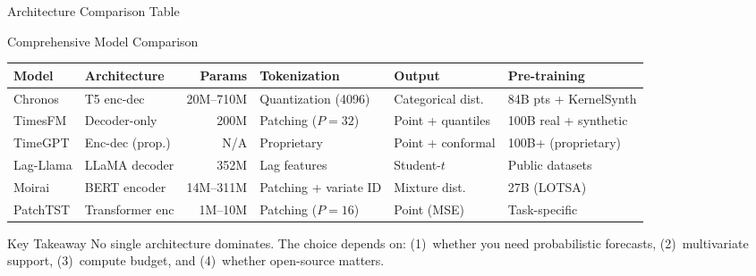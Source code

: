 \documentclass[9pt, aspectratio=169, t]{beamer}
\begin{document}
\begin{frame}{Architecture Comparison Table}
    \begin{cminipage}{0.95\textwidth}
    \vspace{-3mm}
    {\scriptsize
    \begin{block}{Comprehensive Model Comparison}
    \vspace{-2mm}
    \begin{center}
    \begin{tabular}{l|l|r|l|l|l}
        \toprule
        \textbf{Model} & \textbf{Architecture} & \textbf{Params} & \textbf{Tokenization} & \textbf{Output} & \textbf{Pre-training} \\
        \midrule
        Chronos & T5 enc-dec & 20M--710M & Quantization (4096) & Categorical dist.\ & 84B pts + KernelSynth \\
        TimesFM & Decoder-only & 200M & Patching ($P\!=\!32$) & Point + quantiles & 100B real + synthetic \\
        TimeGPT & Enc-dec (prop.) & N/A & Proprietary & Point + conformal & 100B+ (proprietary) \\
        Lag-Llama & LLaMA decoder & 352M & Lag features & Student-$t$ & Public datasets \\
        Moirai & BERT encoder & 14M--311M & Patching + variate ID & Mixture dist.\ & 27B (LOTSA) \\
        PatchTST & Transformer enc & 1M--10M & Patching ($P\!=\!16$) & Point (MSE) & Task-specific \\
        \bottomrule
    \end{tabular}
    \end{center}
    \vspace{-2mm}
    \end{block}
    }
    \vspace{-2mm}
    \begin{exampleblock}{Key Takeaway}
        {\small No single architecture dominates. The choice depends on: (1)~whether you need probabilistic forecasts, (2)~multivariate support, (3)~compute budget, and (4)~whether open-source matters.}
    \end{exampleblock}
    \end{cminipage}
\end{frame}
\end{document}
